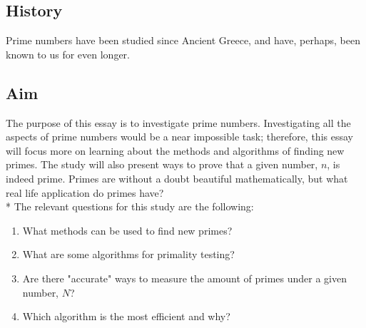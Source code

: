 \documentclass[main.tex]{subfiles}
\begin{document}
\subsection{History}
Prime numbers have been studied since Ancient Greece, and have, perhaps, been known to us for even longer. \cite{prime}

\subsection{Aim}
The purpose of this essay is to investigate prime numbers. Investigating all the aspects of prime numbers would be a near impossible task; therefore, this essay will focus more on learning about the methods and algorithms of finding new primes. The study will also present ways to prove that a given number, $n$, is indeed prime. Primes are without a doubt beautiful mathematically, but what real life application do primes have?
\newline
\\*
The relevant questions for this study are the following:
\begin{enumerate}
    \item What methods can be used to find new primes?
    \item What are some algorithms for primality testing?
    \item Are there "accurate" ways to measure the amount of primes under a given number, $N$?
    \item Which algorithm is the most efficient and why?
\end{enumerate}
\end{document}

